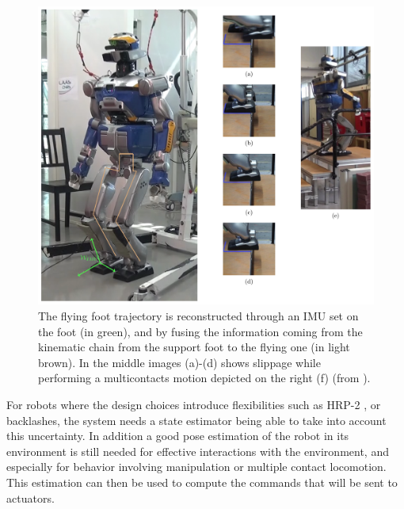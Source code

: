 \begin{figure}
\centering
\includegraphics[width=\linewidth]{./figures/cover-figure.pdf}
	\caption{The flying foot trajectory is reconstructed through an IMU set on the foot (in green), and by fusing the information coming from the kinematic chain
        from the support foot to the flying one (in light brown). In the middle images (a)-(d) shows slippage while performing a multicontacts motion depicted on the
        right (f) (from \cite{Carpentier:ICRA:2016}).
 }
	\label{fig:cover}
\end{figure}

For robots where the design choices introduce flexibilities such as HRP-2 \cite{Nakaoka:iros:2007}, or backlashes, the system needs a state estimator being able to take into account this uncertainty.
In addition a good pose estimation of the robot in its environment is still needed for effective interactions with the environment,
and especially for behavior involving manipulation or multiple contact locomotion.
This estimation can then be used to compute the commands that will be sent to actuators.
%
%

